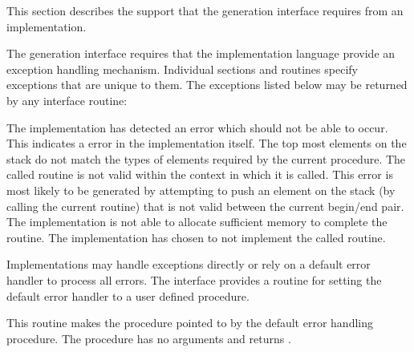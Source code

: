 \label{sec:aux}

This section describes the support that the generation interface
requires from an implementation.  

\label{sec:exceptionHandling}
The generation interface requires that the implementation language
provide an exception handling mechanism.  Individual sections and
routines specify exceptions that are unique to them.  The exceptions
listed below may be returned by any interface routine:
\begin{ErrorList}
 The implementation has detected an error
which should not be able to occur.  This indicates a error in the
implementation itself.
 The top most elements on the stack do
not match the types of elements required by the current procedure.
 The called routine is not valid within
the context in which it is called.  This error is most likely to be
generated by attempting to push an element on the stack (by calling
the current routine) that is not valid between the current begin/end
pair.
 The implementation is not able to allocate
sufficient memory to complete the routine.
 The implementation has chosen to not
implement the called routine.
\end{ErrorList}

Implementations may handle exceptions directly or rely on a default
error handler to process all errors.  The interface provides a routine
for setting the default error handler to a user defined procedure.

\begin{functionality}
This routine makes the procedure pointed to by  the default
error handling procedure.  The procedure  has no arguments
and returns .
\end{functionality}


\label{sec:implementationStack}

